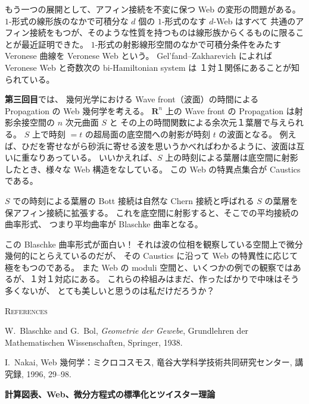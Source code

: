 \documentclass[uplatex,dvipdfmx]{jlreq}
\begin{document}
もう一つの展開として、アフィン接続を不変に保つ Web の変形の問題がある。
$1$-形式の線形族のなかで可積分な $d$ 個の $1$-形式のなす $d$-Web はすべて
共通のアフィン接続をもつが、そのような性質を持つものは線形族からくるものに限ることが最近証明できた。
$1$-形式の射影線形空間のなかで可積分条件をみたす Veronese 曲線を Veronese Web という。
Gel'fand--Zakharevich によれば Veronese Web と奇数次の bi-Hamiltonian system は
１対１関係にあることが知られている。

\bigskip

\noindent\textbf{第三回目}では、
幾何光学における Wave front（波面）の時間による Propagation の Web 幾何学を考える。
$\mathbf{R}^n$ 上の Wave front の Propagation は射影余接空間の $n$ 次元曲面 $S$ と
その上の時間関数による余次元１葉層で与えられる。
$S$ 上で時刻 $= t$ の超局面の底空間への射影が時刻 $t$ の波面となる。
例えば、ひだを寄せながら砂浜に寄せる波を思いうかべればわかるように、波面は互いに重なりあっている。
いいかえれば、$S$ 上の時刻による葉層は底空間に射影したとき、様々な Web 構造をなしている。
この Web の特異点集合が Caustics である。

$S$ での時刻による葉層の Bott 接続は自然な Chern 接続と呼ばれる $S$ の葉層を保アフィン接続に拡張する。
これを底空間に射影すると、そこでの平均接続の曲率形式、
つまり平均曲率が Blaschke 曲率となる。

この Blaschke 曲率形式が面白い！
それは波の位相を観察している空間上で微分幾何的にとらえているのだが、
その Caustics に沿って Web の特異性に応じて極をもつのである。
また Web の moduli 空間と、いくつかの例での観察ではあるが、１対１対応にある。
これらの枠組みはまだ、作ったばかりで中味はそう多くないが、
とても美しいと思うのは私だけだろうか？

\bigskip

\begin{center}
  \textsc{References}
\end{center}

\begin{enumerate}[{[1]}]
  \item W.~Blaschke and G.~Bol,
        \textit{Geometrie der Gewebe},
        Grundlehren der Mathematischen Wissenschaften,
        Springer, 1938.
  \item I.~Nakai,
        Web 幾何学：ミクロコスモス,
        竜谷大学科学技術共同研究センター, 講究録, 1996, 29--98.
\end{enumerate}

\newpage

\begin{center}
{\large\bfseries 計算図表、Web、微分方程式の標準化とツイスター理論}

\hspace*{\fill}{\large\bfseries 佐藤 肇（名古屋大学・多元数理）}
\end{center}
\end{document}
